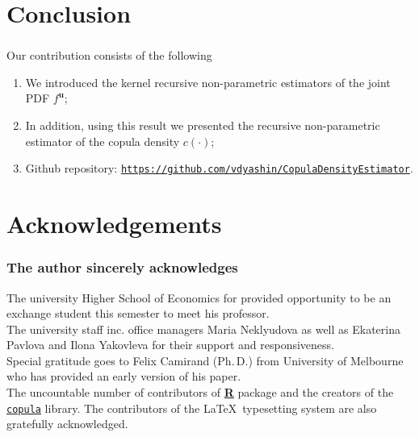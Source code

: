 \documentclass[aspectratio=169]{beamer}
\begin{document}
\section{Conclusion}
	\begin{frame}
		\frametitle{\insertsection}
		
		Our contribution consists of the following
		\begin{enumerate}
			\item<1-> We introduced the kernel recursive non-parametric estimators of the joint PDF $ f^\mathbf{u} $;
			\item<2-> In addition, using this result we presented the recursive non-parametric estimator of the copula density $ c(\cdot) $;
			\item<3-> Github repository: \href{https://github.com/vdyashin/CopulaDensityEstimator}{\texttt{https://github.com/vdyashin/CopulaDensityEstimator}}.
		\end{enumerate}
		
	\end{frame}
	
\section{Acknowledgements}
	\begin{frame}
		\frametitle{The author sincerely acknowledges}
		
		The university Higher School of Economics for provided opportunity to be an exchange student this semester to meet his professor. \\[1em]
		
		The university staff inc. office managers Maria Neklyudova as well as Ekaterina Pavlova and Ilona Yakovleva for their support and responsiveness. \\[1em]
		
		Special gratitude goes to Felix Camirand (Ph.\,D.) from University of Melbourne who has provided an early version of his paper.\\[1em]
		
		The uncountable number of contributors of \href{https://R-project.org/}{\textbf{R}} package and the creators of the \href{https://cran.r-project.org/web/packages/copula/copula.pdf}{\texttt{copula}} library. The contributors of the \LaTeX~typesetting system are also gratefully acknowledged. 
		
	\end{frame}
			
\section{}
	\maketitle
	~\\[-1em]
	\printbibliography
	
\end{document}
